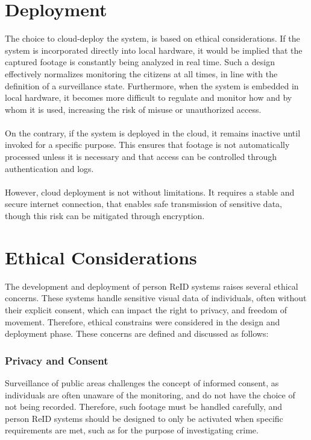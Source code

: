 \section{Deployment}

The choice to cloud-deploy the system, is based on ethical considerations. If the system is incorporated directly into local hardware, it would be implied that the captured footage is constantly being analyzed in real time. Such a design effectively normalizes monitoring the citizens at all times, in line with the definition of a surveillance state. Furthermore, when the system is embedded in local hardware, it becomes more difficult to regulate and monitor how and by whom it is used, increasing the risk of misuse or unauthorized access.
\\\\
On the contrary, if the system is deployed in the cloud, it remains inactive until invoked for a specific purpose. This ensures that footage is not automatically processed unless it is necessary and that access can be controlled through authentication and logs.
\\\\
However, cloud deployment is not without limitations. It requires a stable and secure internet connection, that enables safe transmission of sensitive data, though this risk can be mitigated through encryption.
 

\section{Ethical Considerations}

The development and deployment of person \acs{ReID} systems raises several ethical concerns. These systems handle sensitive visual data of individuals, often without their explicit consent, which can impact the right to privacy, and freedom of movement. Therefore, ethical constrains were considered in the design and deployment phase. These concerns are defined and discussed as follows:

\subsubsection{Privacy and Consent}
Surveillance of public areas challenges the concept of informed consent, as individuals are often unaware of the monitoring, and do not have the choice of not being recorded. Therefore, such footage must be handled carefully, and person \acs{ReID} systems should be designed to only be activated when specific requirements are met, such as for the purpose of investigating crime. 

